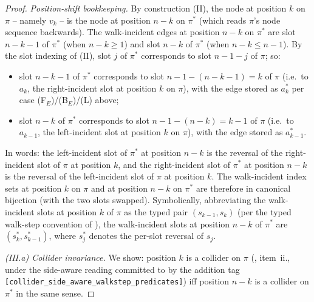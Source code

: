 \documentclass[main]{subfiles}
\begin{document}
\begin{proof}
\smallskip\noindent\emph{Position-shift bookkeeping.}
By construction (II), the node at position $k$ on $\pi$ -- namely $v_k$ -- is the node at position $n - k$ on $\pi^*$ (which reads $\pi$'s node sequence backwards). The walk-incident edges at position $n - k$ on $\pi^*$ are slot $n - k - 1$ of $\pi^*$ (when $n - k \ge 1$) and slot $n - k$ of $\pi^*$ (when $n - k \le n - 1$). By the slot indexing of (II), slot $j$ of $\pi^*$ corresponds to slot $n - 1 - j$ of $\pi$; so:
\begin{itemize}
    \item slot $n - k - 1$ of $\pi^*$ corresponds to slot $n - 1 - (n - k - 1) = k$ of $\pi$ (i.e.\ to $a_k$, the right-incident slot at position $k$ on $\pi$), with the edge stored as $a_k^*$ per case (F$_E$)/(B$_E$)/(L) above;
    \item slot $n - k$ of $\pi^*$ corresponds to slot $n - 1 - (n - k) = k - 1$ of $\pi$ (i.e.\ to $a_{k-1}$, the left-incident slot at position $k$ on $\pi$), with the edge stored as $a_{k-1}^*$.
\end{itemize}
In words: the left-incident slot of $\pi^*$ at position $n - k$ is the reversal of the right-incident slot of $\pi$ at position $k$, and the right-incident slot of $\pi^*$ at position $n - k$ is the reversal of the left-incident slot of $\pi$ at position $k$. The walk-incident index sets at position $k$ on $\pi$ and at position $n - k$ on $\pi^*$ are therefore in canonical bijection (with the two slots swapped). Symbolically, abbreviating the walk-incident slots at position $k$ of $\pi$ as the typed pair $(s_{k-1}, s_k)$ (per the typed walk-step convention of ), the walk-incident slots at position $n - k$ of $\pi^*$ are $(s_k^*, s_{k-1}^*)$, where $s_j^*$ denotes the per-slot reversal of $s_j$.

\smallskip\noindent\emph{(III.a) Collider invariance.}
We show: position $k$ is a collider on $\pi$ (, item~ii., under the side-aware reading committed to by the addition tag \texttt{[collider\_side\_aware\_walkstep\_predicates]}) iff position $n - k$ is a collider on $\pi^*$ in the same sense.


\end{proof}
\end{document}
